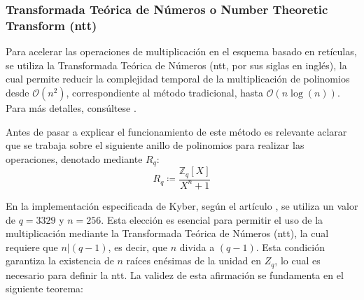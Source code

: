 \subsubsection{Transformada Teórica de Números o Number Theoretic Transform (\gls{ntt})}
Para acelerar las operaciones de multiplicación en el esquema basado en retículas, se utiliza la Transformada Teórica de Números (\gls{ntt}, por sus siglas en inglés), la cual permite reducir la complejidad temporal de la multiplicación de polinomios desde \(\mathcal{O}(n^2)\), correspondiente al método tradicional, hasta \(\mathcal{O}(n \log(n))\). Para más detalles, consúltese \cite{cryptoeprint:2024/585}.
\newline

Antes de pasar a explicar el funcionamiento de este método es relevante aclarar que se trabaja sobre el siguiente anillo de polinomios para realizar las operaciones, denotado mediante \(R_q\):
\begin{equation}
	R_q \coloneqq \dfrac{\mathbb{Z}_q[X]}{X^n + 1}
\end{equation}

En la implementación especificada de Kyber, según el artículo \cite{kyber-spec-2021}, se utiliza un valor de \(q=3329\) y \(n=256\). Esta elección es esencial para permitir el uso de la multiplicación mediante la Transformada Teórica de Números (\gls{ntt}), la cual requiere que \(n| (q-1)\), es decir, que \(n\) divida a \((q-1)\). Esta condición garantiza la existencia de \(n\) raíces enésimas de la unidad en \(Z_q\), lo cual es necesario para definir la \gls{ntt}. La validez de esta afirmación se fundamenta en el siguiente teorema\protect\footnotemark[\value{footnote}]:
\newline

